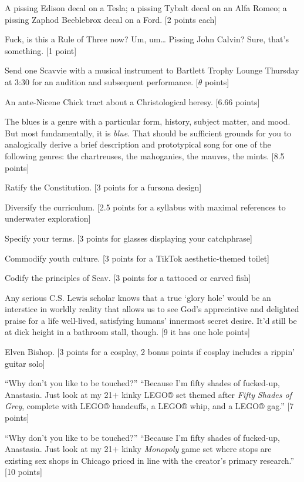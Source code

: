 \documentclass{book}
\begin{document}
\begin{list}{}{}
\item A pissing Edison decal on a Tesla; a pissing Tybalt decal on an Alfa Romeo; a pissing Zaphod Beeblebrox decal on a Ford. [2 points each]
\item Fuck, is this a Rule of Three now? Um, um… Pissing John Calvin? Sure, that’s something. [1 point]
\item Send one Scavvie with a musical instrument to Bartlett Trophy Lounge Thursday at 3:30 for an audition and subsequent performance. [$\theta$ points]
\item An ante-Nicene Chick tract about a Christological heresy. [6.66 points]
\item The blues is a genre with a particular form, history, subject matter, and mood. But most fundamentally, it is \textit{blue}. That should be sufficient grounds for you to analogically derive a brief description and prototypical song for one of the following genres: the chartreuses, the mahoganies, the mauves, the mints. [8.5 points]
\item Ratify the Constitution. [3 points for a fursona design]
\item Diversify the curriculum. [2.5 points for a syllabus with maximal references to underwater exploration]
\item Specify your terms. [3 points for glasses displaying your catchphrase]
\item Commodify youth culture. [3 points for a TikTok aesthetic-themed toilet]
\item Codify the principles of Scav. [3 points for a tattooed or carved fish]
\item Any serious C.S. Lewis scholar knows that a true ‘glory hole’ would be an interstice in worldly reality that allows us to see God’s appreciative and delighted praise for a life well-lived, satisfying humans’ innermost secret desire. It’d still be at dick height in a bathroom stall, though. [9 it has one hole points]
\item Elven Bishop. [3 points for a cosplay, 2 bonus points if cosplay includes a rippin’ guitar solo]
\newpage
\item “Why don't you like to be touched?” “Because I'm fifty shades of fucked-up, Anastasia. Just look at my 21$+$ kinky LEGO® set themed after \textit{Fifty Shades of Grey}, complete with LEGO® handcuffs, a LEGO® whip, and a LEGO® gag.” [7 points]
\item “Why don't you like to be touched?” “Because I'm fifty	 shades of fucked-up, Anastasia. Just look at my 21$+$ kinky \textit{Monopoly} game set where stops are existing sex shops in Chicago priced in line with the creator’s primary research.” [10 points]

\end{list}
\end{document}
